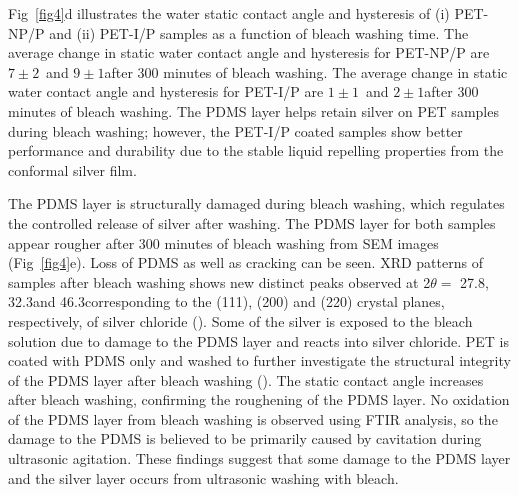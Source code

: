 \documentclass[10pt,letterpaper]{article}
\begin{document}
Fig~\ref{fig4}d illustrates the water static contact angle and hysteresis of (i) PET-NP/P and (ii) PET-I/P samples as a function of bleach washing time. The average change in static water contact angle and hysteresis for %
PET-NP/P are $7 \pm 2$\degree~and $9 \pm 1$\degree after 300 minutes of bleach washing. 
The average change in static water contact angle and hysteresis for 
PET-I/P are $1 \pm 1$\degree~and $2 \pm 1$\degree after 300 minutes of bleach washing. 
The PDMS layer helps retain silver on PET samples during bleach washing; however, the PET-I/P coated samples show better performance and durability due to the stable liquid repelling properties from the conformal silver film. 

The PDMS layer is structurally damaged during bleach washing, which regulates the controlled release of silver after washing. The PDMS layer for both samples appear rougher after 300 minutes of bleach washing from SEM images (Fig~\ref{fig4}e). Loss of PDMS as well as cracking can be seen.  
XRD patterns of samples after bleach washing shows new distinct peaks observed at 2$\theta =$ 27.8\degree, 32.3\degree and 46.3\degree corresponding to the (111), (200) and (220) crystal planes, respectively, of silver chloride (). 
Some of the silver is exposed to the bleach solution due to damage to the PDMS layer and reacts into silver chloride. %
PET is coated with PDMS only and washed to further investigate the structural integrity of the PDMS layer after bleach washing (). The static contact angle increases after bleach washing, confirming the roughening of the PDMS layer. No oxidation of the PDMS layer from bleach washing is observed using FTIR analysis, so the damage to the PDMS is believed to be primarily caused by cavitation during ultrasonic agitation. These findings suggest that some damage to the PDMS layer and the silver layer occurs from ultrasonic washing with bleach.   
\end{document}
